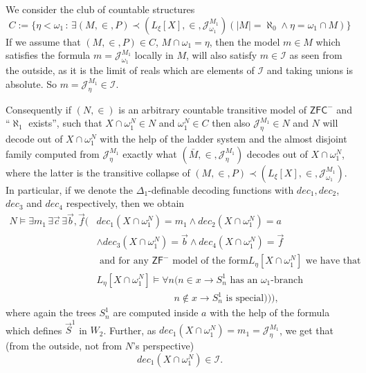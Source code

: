 \documentclass[a4paper,11pt]{article}
\newcommand{\ZFC}{\mathsf{ZFC}}
\newcommand{\ZFP}{\mathsf{ZF}^-}
\begin{document}
We consider the club of countable structures \[ C:= \{ \eta < \omega_1 \, : \, \exists (M, \in, P) \prec (L_{\xi}[X],\in,\mathcal{J}^{M_1}_{\omega_1})( |M|=\aleph_0 \land \eta= \omega_1 \cap M) \}\]
If we assume that $(M,\in,P) \in C$, $M \cap \omega_1 = \eta$, then the model $m\in  M$ which satisfies the formula $m=\mathcal{J}^{M_1}_{\omega_1}$ locally in $M$, will also satisfy $m \in \mathcal{I}$ as seen from the outside, as it is the limit of reals which are elements of $\mathcal{I}$ and taking unions is absolute. So $m= \mathcal{J}^{M_1}_{\eta} \in \mathcal{I}$.

Consequently if $(N, \in)$ is an arbitrary countable transitive model of $\ZFC^-$ and ``$\aleph_1$ exists'', such that
$X\cap \omega_1^N \in N$ and $\omega_1^N \in C$ then also $\mathcal{J}^{M_1}_{\eta} \in N$ and $N$ will decode out of $X \cap \omega_1^N$ with the help of the ladder system and the almost disjoint family computed from $\mathcal{J}^{M_1}_{\eta}$ exactly what $(\bar{M},\in,\mathcal{J}^{M_1}_{\eta})$ decodes out of $X \cap \omega_1^N$, where the latter is the transitive collapse of  $(M,\in, P) \prec (L_{\xi}[X],\in, \mathcal{J}^{M_1}_{\omega_1})$. In particular, if we denote the $\Delta_1$-definable decoding functions with $dec_1,dec_2$, $dec_3$ and $dec_4$ respectively, then we obtain 
\begin{align*}
N \models \exists m_1 \, \exists \vec{c} \, \exists \vec{b}, \vec{f} (& dec_1(X\cap \omega_1^N)=m_1 \land dec_2(X \cap \omega_1^N)= a \\& \land dec_3(X \cap \omega_1^N)=\vec{b} \land dec_4(X\cap \omega_1^N)=\vec{f} \\& \text{ and for any $\ZFP$ model of the form
$L_{\eta}[X \cap \omega_1^N]$ we have that} \\&
			L_{\eta} [X \cap \omega_1^N] \models  \forall n ( n \in x\rightarrow S^1_{n}  \text{ has an $\omega_1$-branch}  \\&
		 \qquad \qquad \qquad  \quad \quad  	n \notin x\rightarrow S^1_{n}  \text{ is special})) ),
        \end{align*}
        where again the trees $S^1_n$ are computed inside $a$ with the help of the formula which defines $\vec{S}^1$ in $W_2$.
Further, as $dec_1(X \cap \omega_1^N)=m_1=\mathcal{J}^{M_1}_{\eta}$, we get that (from the outside, not from $N$'s perspective)
\[ dec_1(X \cap \omega_1^N) \in \mathcal{I}.\]
\end{document}
